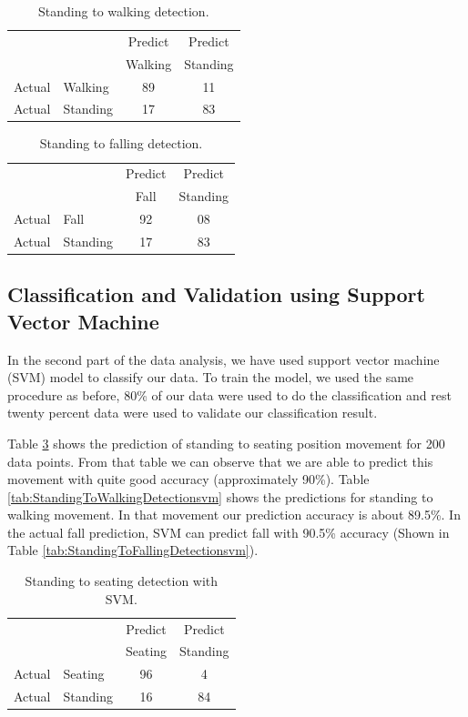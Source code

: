\documentclass[letterpaper]{article}
\begin{document}
\begin{table}
\caption{Standing to walking detection.}
	\label{tab:StandingToWalkingDetection}
\centering
		\begin{tabular} {l l |c |c}
			& & Predict& Predict \\ 
			& & Walking & Standing \\ \hline
			Actual& Walking & 89 & 11\\ \hline
			Actual& Standing & 17& 83\\ \hline
		\end{tabular}
\end{table}

\begin{table}[!ht]
\caption{Standing to falling detection.}
\label{tab:StandingToFallingDetection}
\centering
		\begin{tabular} {l l |c |c}
			& & Predict& Predict \\ 
			& & Fall & Standing \\ \hline
			Actual& Fall & 92 & 08\\ \hline
			Actual& Standing & 17& 83\\ \hline
		\end{tabular}
\end{table}

\subsection*{Classification and Validation using Support Vector Machine}

In the second part of the data analysis, we have used support vector machine (SVM) model
to classify our data. To train the model, we used the same procedure as before, 80\% of
our data were used to do the classification and rest twenty percent data were used to validate our
classification result.

Table \ref{tab:StandingToSeatingDetectionsvm} shows the prediction of standing to seating position
movement for 200 data points. From that table we can observe that we are able to predict this
movement with quite good accuracy (approximately 90\%). Table
\ref{tab:StandingToWalkingDetectionsvm} shows the predictions for standing to
walking movement. In that movement our prediction accuracy is about 89.5\%. In the actual fall
prediction, SVM can predict fall with 90.5\% accuracy (Shown in Table
\ref{tab:StandingToFallingDetectionsvm}).
\begin{table}[!ht]
\caption{Standing to seating detection with SVM.}
	\label{tab:StandingToSeatingDetectionsvm}
	\centering
		\begin{tabular} {l l |c |c}
			& & Predict& Predict \\ 
			& & Seating & Standing \\ \hline
			Actual& Seating & 96 & 4\\ \hline
			Actual& Standing & 16& 84\\ \hline
		\end{tabular}
\end{table}
\end{document}
